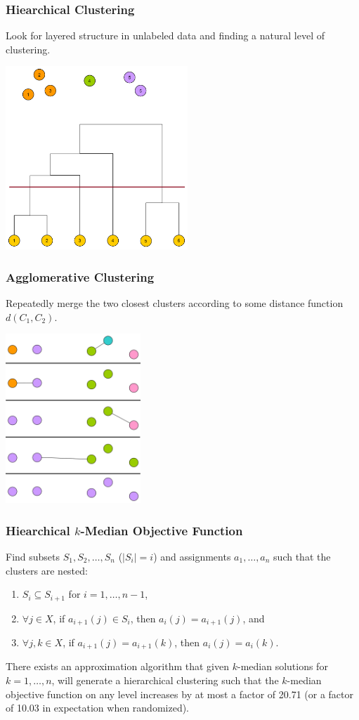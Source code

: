 \documentclass[usenames,dvipsnames]{beamer}
\begin{document}
\begin{frame}
\frametitle{Hiearchical Clustering}
Look for layered structure in unlabeled data and finding a natural level of clustering.
\begin{center}
\includegraphics[width=2.7in]{hierarchical-clustering-example}
\end{center}
\end{frame}

\begin{frame}
\frametitle{Agglomerative Clustering}
Repeatedly merge the two closest clusters according to some distance function $d(C_1, C_2)$. 
\begin{center}
\includegraphics[width=2in]{agglomerative-clustering}
\end{center}
\end{frame}

\begin{frame}
\frametitle{Hiearchical $k$-Median Objective Function}
Find subsets $S_1, S_2, \ldots, S_n$ ($|S_i| = i$) and assignments $a_1, \ldots, a_n$ such that the clusters are nested:
\begin{enumerate}
\item $S_i \subseteq S_{i+1}$ for $i = 1, \ldots, n-1$,
\item $\forall j \in X$, if $a_{i+1}(j) \in S_i$, then $a_i(j) = a_{i+1}(j)$, and
\item $\forall j, k \in X$, if $a_{i+1}(j) = a_{i+1}(k)$, then $a_{i}(j) = a_{i}(k)$. 
\end{enumerate}

\vspace{0.5in}
There exists an approximation algorithm that given $k$-median solutions for $k=1, \ldots, n$, will generate a hierarchical clustering such that the $k$-median objective function on any level increases by at most a factor of 20.71 (or a factor of 10.03 in expectation when randomized).
\end{frame}
\end{document}
